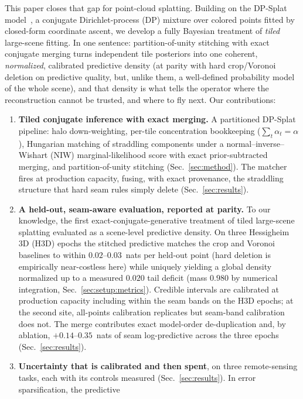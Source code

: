  This paper closes that gap for point-cloud splatting. Building on the
DP-Splat model~\cite{dong2026dpsplat}, a conjugate Dirichlet-process
(DP) mixture over colored points fitted by closed-form coordinate
ascent, we
develop a fully Bayesian treatment of \emph{tiled} large-scene fitting.
In one sentence: partition-of-unity stitching with exact conjugate
merging turns independent tile posteriors into one coherent,
\emph{normalized}, calibrated predictive density (at parity with hard
crop/Voronoi deletion on predictive quality, but, unlike them, a
well-defined probability model of the whole scene), and that density is
what tells the operator where the reconstruction cannot be trusted, and
where to fly next. Our contributions:
\begin{enumerate}
\item \textbf{Tiled conjugate inference with exact merging.} A partitioned
  DP-Splat pipeline: halo down-weighting, per-tile concentration bookkeeping
  ($\sum_t \alpha_t = \alpha$), Hungarian matching of straddling
  components under a normal--inverse--Wishart (NIW)
  marginal-likelihood score with exact prior-subtracted merging,
  and partition-of-unity stitching
  (Sec.~\ref{sec:method}). The matcher fires at production capacity,
  fusing, with exact provenance, the straddling structure that hard
  seam rules simply delete (Sec.~\ref{sec:results}).
\item \textbf{A held-out, seam-aware evaluation, reported at parity.}
  To our knowledge, the first exact-conjugate-generative treatment of
  tiled large-scene splatting evaluated as a scene-level predictive
  density. On three Hessigheim 3D (H3D) epochs the stitched predictive
  matches the crop and Voronoi baselines to within $0.02$--$0.03$~nats
  per held-out point (hard deletion is empirically near-costless
  here) while uniquely yielding a global density normalized up to a
  measured $0.020$ tail deficit (mass $0.980$ by numerical
  integration, Sec.~\ref{sec:setup:metrics}). Credible intervals are calibrated at
  production capacity including within the seam bands on the H3D
  epochs; at the second site, all-points calibration replicates but
  seam-band calibration does not. The merge contributes exact
  model-order de-duplication and, by ablation, $+0.14$--$0.35$~nats of
  seam log-predictive across the three epochs (Sec.~\ref{sec:results}).
\item \textbf{Uncertainty that is calibrated and then spent}, on three
  remote-sensing tasks, each with its controls measured
  (Sec.~\ref{sec:results}). In error sparsification, the predictive

\end{enumerate}
